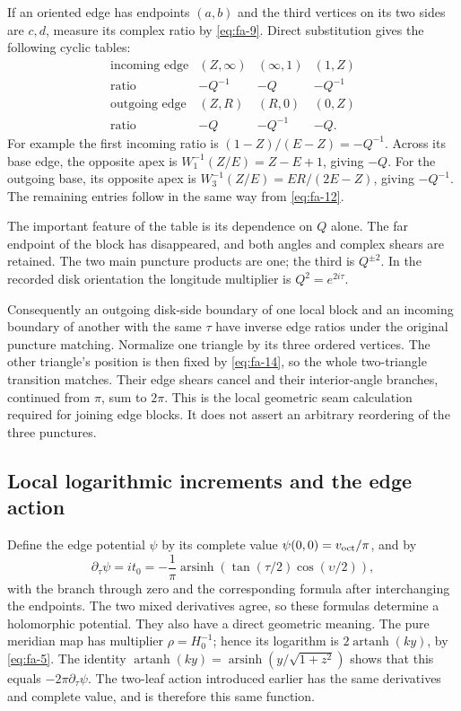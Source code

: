 If an oriented edge has endpoints \((a,b)\) and the third vertices on its two sides are \(c,d\), measure its complex ratio by \eqref{eq:fa-9}. Direct substitution gives the following cyclic tables:
\begin{equation}
\begin{array}{c|ccc}
\text{incoming edge}&(Z,\infty)&(\infty,1)&(1,Z)\\ \hline
\text{ratio}&-Q^{-1}&-Q&-Q^{-1}\\[1mm]
\text{outgoing edge}&(Z,R)&(R,0)&(0,Z)\\ \hline
\text{ratio}&-Q&-Q^{-1}&-Q.
\end{array}
\label{eq:fa-14}
\end{equation}
For example the first incoming ratio is \((1-Z)/(E-Z)=-Q^{-1}\). Across its base edge, the opposite apex is \(W_1^{-1}(Z/E)=Z-E+1\), giving \(-Q\). For the outgoing base, its opposite apex is \(W_3^{-1}(Z/E)=ER/(2E-Z)\), giving \(-Q^{-1}\). The remaining entries follow in the same way from \eqref{eq:fa-12}.

The important feature of the table is its dependence on \(Q\) alone.
The far endpoint of the block has disappeared, and both angles and
complex shears are retained. The two main puncture products are one;
the third is \(Q^{\pm2}\). In the recorded disk orientation the
longitude multiplier is \(Q^2=e^{2i\tau}\).

Consequently an outgoing disk-side boundary of one local block and an incoming boundary of another with the same \(\tau\) have inverse edge ratios under the original puncture matching. Normalize one triangle by its three ordered vertices. The other triangle's position is then fixed by \eqref{eq:fa-14}, so the whole two-triangle transition matches. Their edge shears cancel and their interior-angle branches, continued from \(\pi\), sum to \(2\pi\). This is the local geometric seam calculation required for joining edge blocks. It does not assert an arbitrary reordering of the three punctures.

\subsection{Local logarithmic increments and the edge action}\label{sec:fa-5}

Define the edge potential \(\psi\) by its complete value
\(\psi(0,0)=v_{\rm oct}/\pi\), and by
\begin{equation}
\partial_\tau\psi=it_0
   =-\frac1\pi\operatorname{arsinh}
                   (\tan(\tau/2)\cos(\upsilon/2)),
\label{eq:fa-15}
\end{equation}
with the branch through zero and the corresponding formula after
interchanging the endpoints. The two mixed derivatives agree, so these
formulas determine a holomorphic potential. They also have a direct
geometric meaning. The pure meridian map has multiplier
\(\rho=H_0^{-1}\); hence its logarithm is
\(2\operatorname{artanh}(ky)\), by \eqref{eq:fa-5}.
The identity
\(\operatorname{artanh}(ky)=
\operatorname{arsinh}(y/\sqrt{1+z^2})\)
shows that this equals \(-2\pi\partial_\tau\psi\).
The two-leaf action introduced earlier has the same derivatives and
complete value, and is therefore this same function.

